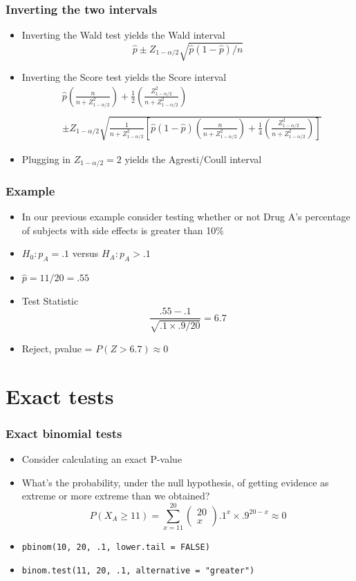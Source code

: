 \documentclass[aspectratio=169]{beamer}
\begin{document}
\begin{frame}\frametitle{Inverting the two intervals}
  \begin{itemize}
  \item Inverting the Wald test yields the Wald interval
    $$
    \hat p \pm Z_{1 - \alpha / 2} \sqrt{\hat p(1 - \hat p) / n}
    $$
  \item Inverting the Score test yields the Score interval
    \small
    \begin{eqnarray*}
      &  \hat p \left(\frac{n}{n + Z_{1 - \alpha / 2}^2}\right) + 
      \frac{1}{2} \left(\frac{Z_{1 - \alpha / 2}^2}{n + Z_{1 - \alpha / 2}^2}\right) \\\\ 
      &  \pm Z_{1 - \alpha/2}\sqrt{\frac{1}{n + Z_{1 - \alpha / 2}^2} 
        \left[\hat p (1 - \hat p) \left(\frac{n}{n + Z_{1 - \alpha / 2}^2}\right) +
          \frac{1}{4} \left(\frac{Z_{1 - \alpha / 2}^2}{n + Z_{1 - \alpha / 2}^2}\right)
        \right]}
    \end{eqnarray*}
    \normalsize
  \item Plugging in $Z_{1-\alpha / 2} = 2$ yields the Agresti/Coull interval
  \end{itemize}
\end{frame}

\begin{frame}\frametitle{Example}
  \begin{itemize}
  \item In our previous example consider testing whether or not Drug A's
    percentage of subjects with side effects is greater than 10\%
  \item $H_0 : p_A = .1$ versus $H_A : p_A > .1$ 
  \item $\hat p = 11 / 20 = .55$
  \item Test Statistic $$\frac{.55 - .1}{\sqrt{.1 \times .9 / 20}} = 6.7$$
  \item Reject, pvalue = $P(Z > 6.7) \approx 0$
  \end{itemize}
\end{frame}

\section{Exact tests}
\begin{frame}\frametitle{Exact binomial tests} 
  \begin{itemize}
  \item Consider calculating an exact P-value
  \item What's the probability, under the null hypothesis, of getting
    evidence as extreme or more extreme than we obtained?
    $$P(X_A \geq 11) = 
    \sum_{x=11}^{20}\left(\begin{array}{c}20 \\ x \end{array}\right) .1^x\times .9^{20-x}
    \approx 0
    $$
  \item \texttt{pbinom(10, 20, .1, lower.tail = FALSE)}
  \item \texttt{binom.test(11, 20, .1, alternative = "greater")}
  \end{itemize}
\end{frame}
\end{document}
